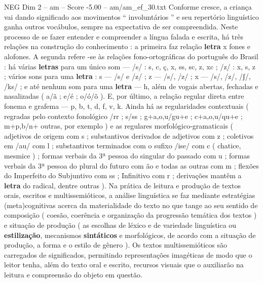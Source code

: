 \begin{textsample}{NEG Dim 2 – am – Score -5.00 – am/am\_ef\_30.txt}
Conforme cresce, a criança vai dando significado aos movimentos “ involuntários ” e seu repertório linguístico ganha outros vocábulos, sempre na expectativa de ser compreendida.
Neste processo de se fazer entender e compreender a língua falada e escrita, há três relações na construção do conhecimento : a primeira faz relação \textbf{letra} x fones e alofones.
A segunda refere -se às relações fono-ortográficas do português do Brasil : há várias \textbf{letras} para um único som — /s/ : s, c, ç, x, ss, sc, z, xc ; /z/ : x, s, z ; vários sons para uma \textbf{letra} : s — /s/ e /z/ ; z — /s/, /z/ ; x — /s/, /z/, /ʃ/, /ks/ ; e até nenhum som para uma \textbf{letra} — h, além de vogais abertas, fechadas e nasalizadas ( a/ã ; e/é ; o/ó/õ ).
E, por último, a relação regular direta entre fonema e grafema — p, b, t, d, f, v, k.
Ainda há as regularidades contextuais ( regradas pelo contexto fonológico /rr ; s/ss ; g+a,o,u/gu+e ; c+a,o,u/qu+e ; m+p,b/n+ outras, por exemplo ) e as regulares morfológico-gramaticais ( adjetivos de origem com s ; substantivos derivados de adjetivos com z ; coletivos em /au/ com l ; substantivos terminados com o sufixo /ise/ com c ( chatice, mesmice ) ; formas verbais da 3ª pessoa do singular do passado com u ; formas verbais da 3ª pessoa do plural do futuro com ão e todas as outras com m ; flexões do Imperfeito do Subjuntivo com ss ; Infinitivo com r ; derivações mantêm a \textbf{letra} do radical, dentre outras ).
Na prática de leitura e produção de textos orais, escritos e multissemióticos, a análise linguística se faz mediante estratégias (meta)cognitivas acerca da materialidade do texto no que tange ao seu sentido de composição ( coesão, coerência e organização da progressão temática dos textos ) e situação de produção ( as escolhas de léxico e de variedade linguística ou \textbf{estilização}, mecanismos \textbf{sintáticos} e morfológicos, de acordo com a situação de produção, a forma e o estilo de gênero ).
Os textos multissemióticos são carregados de significados, permitindo representações imagéticas de modo que o leitor tenha, além do texto oral e escrito, recursos visuais que o auxiliarão na leitura e compreensão do objeto em questão.

\end{textsample}
